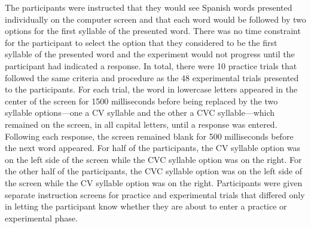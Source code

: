 The participants were instructed that they would see Spanish words presented individually on the computer screen and that each word would be followed by two options for the first syllable of the presented word. There was no time constraint for the participant to select the option that they considered to be the first syllable of the presented word and the experiment would not progress until the participant had indicated a response. %
In total, there were 10 practice trials that followed the same criteria and procedure as the 48 experimental trials presented to the participants. %
For each trial, the word in lowercase letters appeared in the center of the screen for 1500 milliseconds before being replaced by the two syllable options---one a CV syllable and the other a CVC syllable---which remained on the screen, in all capital letters, until a response was entered. Following each response, the screen remained blank for 500 milliseconds before the next word appeared. %
For half of the participants, the CV syllable option was on the left side of the screen while the CVC syllable option was on the right. For the other half of the participants, the CVC syllable option was on the left side of the screen while the CV syllable option was on the right. Participants were given separate instruction screens for practice and experimental trials that differed only in letting the participant know whether they are about to enter a practice or experimental phase. %


